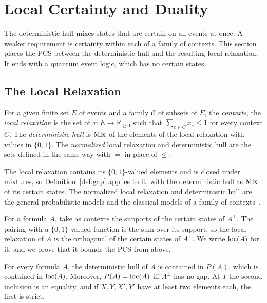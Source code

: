 \section{Local Certainty and Duality}
\label{sec:duality}

The deterministic hull mixes states that are certain on all events at once. A
weaker requirement is certainty within each of a family of contexts. This section places the PCS between the deterministic hull
and the resulting local relaxation. It ends with a quantum event logic,
which has no certain states.

\subsection{The Local Relaxation}
\label{sec:duality-local}

\begin{definition}
\label{def:local}
For a given finite set $E$ of events and a family $\mathcal{C}$ of
subsets of $E$, the \emph{contexts}, the \emph{local relaxation} is the set
of $x : E \to \mathbb{R}_{\ge 0}$ such that $\sum_{e \in C} x_e \le 1$
for every context $C$. The \emph{deterministic hull} is $\mathrm{Mix}$ of the
elements of the local relaxation with values in $\{0,1\}$. The
\emph{normalized} local relaxation and deterministic hull are the sets defined in the
same way with $=$ in place of $\le$.
\end{definition}

\noindent
The local relaxation contains its
$\{0,1\}$-valued elements and is closed under mixtures, so
Definition~\ref{def:gap} applies to it, with the deterministic hull as
$\mathrm{Mix}$ of its certain states. The normalized local relaxation and deterministic hull are
the general probabilistic models and the classical models of a family of
contexts~\cite{acin2015}.

For a formula $A$, take as contexts the supports of the certain states of
$A^{\perp}$. The pairing with a $\{0,1\}$-valued function is the sum over
its support, so the local relaxation of $A$ is the orthogonal of the certain
states of $A^{\perp}$. We write $\mathrm{loc}(A)$ for it,
and we prove that it bounds the PCS from above.

\begin{theorem}
\label{thm:loc-linear}
For every formula $A$, the deterministic hull of $A$ is contained in $P(A)$, which is contained in $\mathrm{loc}(A)$. Moreover, $P(A) = \mathrm{loc}(A)$ iff $A^{\perp}$
has no gap.
At $T$ the second inclusion is an equality, and if $X, Y, X', Y'$ have at
least two elements each, the first is strict.
\end{theorem}

